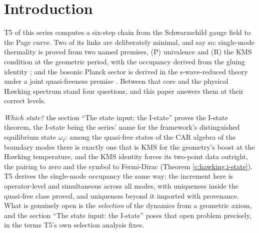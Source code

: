 \documentclass[11pt]{article}
\theoremstyle{definition}
\theoremstyle{plain}
\begin{document}
\noindent{}
\newpage

\section{Introduction}

\label{c:note.hawking.setting-introduction}
T5 of this series \cite{ButlerT5} computes a six-step chain from the Schwarzschild gauge field to the Page curve. Two of its links are deliberately minimal, and say so: single-mode thermality is proved from two named premises, (P) univalence and (R) the KMS condition at the geometric period, with the occupancy derived from the gluing identity \cite[Prems.~7.8 and 7.19, Thm.~7.20]{ButlerT5}; and the bosonic Planck sector is derived in the s-wave-reduced theory under a joint quasi-freeness premise \cite[Prem.~8.1]{ButlerT5}. Between that core and the physical Hawking spectrum stand four questions, and this paper answers them at their correct levels.

\emph{Which state?} the section ``The state input: the I-state'' proves the I-state theorem, the I-state being the series' name for the framework's distinguished equilibrium state $\omega_I$: among the quasi-free states of the CAR algebra of the boundary modes there is exactly one that is KMS for the geometry's boost at the Hawking temperature, and the KMS identity forces its two-point data outright, the pairing to zero and the symbol to Fermi-Dirac (Theorem \ref{c:hawking.i-state}). T5 derives the single-mode occupancy the same way; the increment here is operator-level and simultaneous across all modes, with uniqueness inside the quasi-free class proved, and uniqueness beyond it imported with provenance. What is genuinely open is the \emph{selection} of the dynamics from a geometric axiom, and the section ``The state input: the I-state'' poses that open problem precisely, in the terms T5's own selection analysis fixes.
\end{document}
